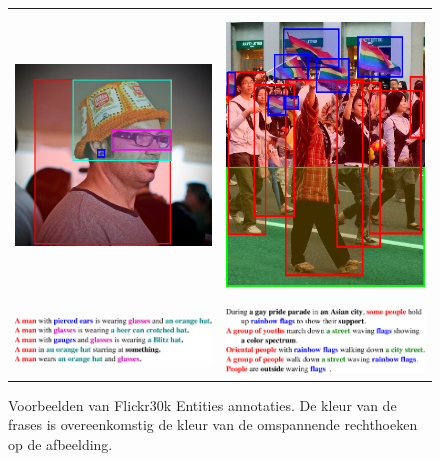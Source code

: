 \begin{figure}[!tb]
    \centering
    \begin{tabular}[t]{cc}
      \includegraphics[height=3.0in]{Images/example_hat.png} \vspace{-3mm}&
      \includegraphics[height=3.0in]{Images/example_parade.png}\\
      \includegraphics[valign = T,width=.4\columnwidth]{Images/example_hat_text.pdf}&
      \includegraphics[valign = T,width=.4\columnwidth]{Images/example_parade_text.pdf}
  \end{tabular}
\caption{Voorbeelden van Flickr30k Entities annotaties. De kleur van de frases is overeenkomstig de kleur van de omspannende rechthoeken op de afbeelding\cite{Plummer2015}.}
\label{fig:entities}
\end{figure}

